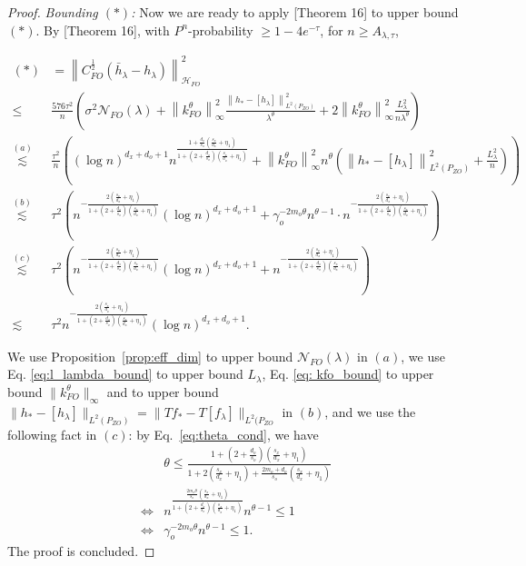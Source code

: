 \documentclass[11pt]{article}
\newcommand{\calH}{\mathcal{H}}
\newcommand{\calN}{\mathcal{N}}
\newcommand{\0}{\mathbf{0}}
\begin{document}
\begin{appendix}
\begin{proof}
\textit{Bounding $(\ast)$:  } Now we are ready to apply \cite{fischer2020sobolev}[Theorem 16] to upper bound $(\ast)$. 
By \cite{fischer2020sobolev}[Theorem 16], with $P^n$-probability $\geq 1 - 4e^{-\tau}$, for $n\geq A_{\lambda,\tau}$,
\begin{small}
\begin{align*}
    (\ast) &= \left\|C_{FO}^{\frac{1}{2}}\left(\bar{h}_{\lambda} - h_{\lambda}\right)\right\|_{\calH_{FO}}^2 
    \\ \leq &\frac{576\tau^2}{n} \left(\sigma^2\calN_{FO}(\lambda) + \left\|k^{\theta}_{FO}\right\|_{\infty}^2\frac{\left\|h_{\ast} - [h_{\lambda}]\right\|_{L^2(P_{ZO})}^2}{\lambda^{\theta}} + 2\left\|k^{\theta}_{FO}\right\|_{\infty}^2\frac{L_{\lambda}^2}{n\lambda^{\theta}} \right) \\
    \stackrel{(a)}{\lesssim} &\frac{\tau^2}{n} \left((\log n)^{d_x+d_o+1} n^{\frac{1+\frac{d_o}{s_o}(\frac{s_x}{d_x}+\eta_1)}{1+(2+\frac{d_o}{s_o})(\frac{s_x}{d_x}+\eta_1)}} + \left\|k^{\theta}_{FO}\right\|_{\infty}^2n^{\theta}\left(\left\|h_{\ast} - [h_{\lambda}]\right\|_{L^2(P_{ZO})}^2 + \frac{L_{\lambda}^2}{n}\right)\right)\\
    \stackrel{(b)}{\lesssim} & \tau^2\left(n^{-\frac{2(\frac{s_x}{d_x}+\eta_1)}{1+(2+\frac{d_o}{s_o})(\frac{s_x}{d_x}+\eta_1)}} (\log n)^{d_x+d_o+1} + \gamma_o^{-2m_o\theta}  n^{\theta-1} \cdot n^{-\frac{2(\frac{s_x}{d_x}+\eta_1)}{1+(2+\frac{d_o}{s_o})(\frac{s_x}{d_x}+\eta_1)}}\right)\\
    \stackrel{(c)}{\lesssim} & \tau^2\left(n^{-\frac{2(\frac{s_x}{d_x}+\eta_1)}{1+(2+\frac{d_o}{s_o})(\frac{s_x}{d_x}+\eta_1)}} (\log n)^{d_x+d_o+1} + n^{-\frac{2(\frac{s_x}{d_x}+\eta_1)}{1+(2+\frac{d_o}{s_o})(\frac{s_x}{d_x}+\eta_1)}} \right)\\
    \lesssim & \tau^2 n^{-\frac{2(\frac{s_x}{d_x}+\eta_1)}{1+(2+\frac{d_o}{s_o})(\frac{s_x}{d_x}+\eta_1)}} (\log n)^{d_x+d_o+1}.
\end{align*}
\end{small}
We use Proposition~\ref{prop:eff_dim} to upper bound $\calN_{FO}(\lambda)$ in $(a)$,
we use Eq. \eqref{eq:l_lambda_bound} to upper bound $L_\lambda$, Eq. \eqref{eq: kfo_bound} to upper bound $\|k^{\theta}_{FO}\|_{\infty}$ and  to upper bound $ \|h_{\ast} - [h_{\lambda}]\|_{L^2(P_{ZO})} = \|T f_{\ast} - T[f_{\lambda}]\|_{L^2(P_{ZO}}$ in $(b)$, and we use the following fact in $(c)$: by Eq.~\eqref{eq:theta_cond}, we have
\begin{align*}
    &\theta \leq \frac{1+(2+\frac{d_o}{s_o})(\frac{s_x}{d_x}+\eta_1)}{1+2(\frac{s_x}{d_x}+\eta_1)+\frac{2m_o+d_o}{s_o}(\frac{s_x}{d_x}+\eta_1)} \\
    \iff & n^{\frac{\frac{2m_o \theta}{s_o}(\frac{s_x}{d_x}+\eta_1)}{1+(2+\frac{d_o}{s_o})(\frac{s_x}{d_x}+\eta_1)}} n^{\theta-1} \leq 1\\
    \iff & \gamma_o^{-2m_o\theta}n^{\theta-1} \leq 1. 
\end{align*}
The proof is concluded.
\end{proof}






\end{appendix}
\end{document}
